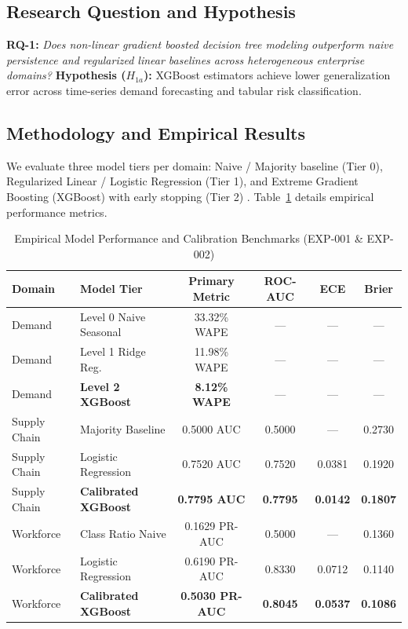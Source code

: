 \documentclass[10pt,conference]{IEEEtran}
\begin{document}
\subsection{Research Question and Hypothesis}
\textbf{RQ-1:} \textit{Does non-linear gradient boosted decision tree modeling outperform naive persistence and regularized linear baselines across heterogeneous enterprise domains?}  
\textbf{Hypothesis ($H_{1a}$):} XGBoost estimators achieve lower generalization error across time-series demand forecasting and tabular risk classification.

\subsection{Methodology and Empirical Results}
We evaluate three model tiers per domain: Naive / Majority baseline (Tier 0), Regularized Linear / Logistic Regression (Tier 1), and Extreme Gradient Boosting (XGBoost) with early stopping (Tier 2) \cite{chen2016xgboost}. Table~\ref{tab:model_performance} details empirical performance metrics.

\begin{table}[htbp]
\caption{Empirical Model Performance and Calibration Benchmarks (EXP-001 \& EXP-002)}
\begin{center}
\begin{tabular}{llcccc}
\toprule
\textbf{Domain} & \textbf{Model Tier} & \textbf{Primary Metric} & \textbf{ROC-AUC} & \textbf{ECE} & \textbf{Brier} \\
\midrule
Demand & Level 0 Naive Seasonal & 33.32\% WAPE & --- & --- & --- \\
Demand & Level 1 Ridge Reg. & 11.98\% WAPE & --- & --- & --- \\
Demand & \textbf{Level 2 XGBoost} & \textbf{8.12\% WAPE} & --- & --- & --- \\
\midrule
Supply Chain & Majority Baseline & 0.5000 AUC & 0.5000 & --- & 0.2730 \\
Supply Chain & Logistic Regression & 0.7520 AUC & 0.7520 & 0.0381 & 0.1920 \\
Supply Chain & \textbf{Calibrated XGBoost} & \textbf{0.7795 AUC} & \textbf{0.7795} & \textbf{0.0142} & \textbf{0.1807} \\
\midrule
Workforce & Class Ratio Naive & 0.1629 PR-AUC & 0.5000 & --- & 0.1360 \\
Workforce & Logistic Regression & 0.6190 PR-AUC & 0.8330 & 0.0712 & 0.1140 \\
Workforce & \textbf{Calibrated XGBoost} & \textbf{0.5030 PR-AUC} & \textbf{0.8045} & \textbf{0.0537} & \textbf{0.1086} \\
\bottomrule
\end{tabular}
\label{tab:model_performance}
\end{center}
\end{table}
\end{document}
